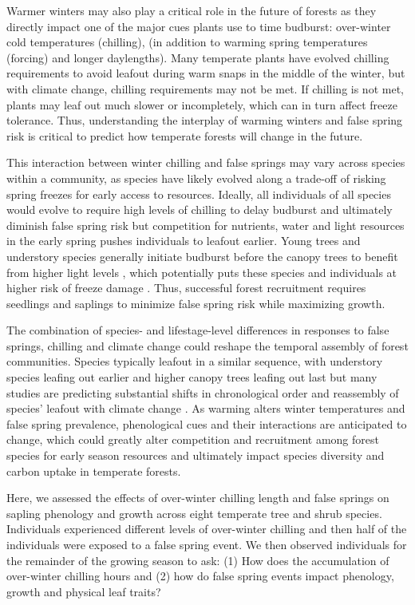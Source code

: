 \documentclass{article}\usepackage[]{graphicx}\usepackage[]{color}
\begin{document}
Warmer winters may also play a critical role in the future of forests as they directly impact one of the  major cues plants use to time budburst: over-winter cold temperatures (chilling), (in addition to warming spring temperatures (forcing) and longer daylengths). Many temperate plants have evolved chilling requirements to avoid leafout during warm snaps in the middle of the winter, but with climate change, chilling requirements may not be met. If chilling is not met, plants may leaf out much slower or incompletely, which can in turn affect freeze tolerance. Thus, understanding the interplay of warming winters and false spring risk is critical to predict how temperate forests will change in the future.
  
This interaction between winter chilling and false springs may vary across species within a community, as species have likely evolved along a trade-off of risking spring freezes for early access to resources. Ideally, all individuals of all species would evolve to require high levels of chilling to delay budburst and ultimately diminish false spring risk but competition for nutrients, water and light resources in the early spring pushes individuals to leafout earlier. Young trees and understory species generally initiate budburst before the canopy trees to benefit from higher light levels \citep {Augspurger2008, Vitasse2013}, which potentially puts these species and individuals at higher risk of freeze damage \citep{Vitasse2014}. Thus, successful forest recruitment requires seedlings and saplings to minimize false spring risk while maximizing growth.
 
The combination of species- and lifestage-level differences in responses to false springs, chilling and climate change could reshape the temporal assembly of forest communities. Species typically leafout in a similar sequence, with understory species leafing out earlier and higher canopy trees leafing out last but many studies are predicting substantial shifts in chronological order and reassembly of species' leafout with climate change \citep{Roberts2015, Laube2014}. As warming alters winter temperatures and false spring prevalence, phenological cues and their interactions are anticipated to change, which could greatly alter competition and recruitment among forest species for early season resources and ultimately impact species diversity and carbon uptake in temperate forests.
  
Here, we assessed the effects of over-winter chilling length and false springs on sapling phenology and growth across eight temperate tree and shrub species. Individuals experienced different levels of over-winter chilling and then half of the individuals were exposed to a false spring event. We then observed individuals for the remainder of the growing season to ask: (1) How does the accumulation of over-winter chilling hours and (2) how do false spring events impact phenology, growth and physical leaf traits?
\end{document}
